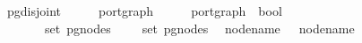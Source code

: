 \isamarkupfalse%
\ pg{\isacharunderscore}disjoint\ {\isacharcolon}{\isacharcolon}\ {\isachardoublequoteopen}{\isacharparenleft}\ \ \ \ port{\isacharunderscore}graph\ {\isasymRightarrow}\ {\isacharparenleft}\ \ \ \ port{\isacharunderscore}graph\ {\isasymRightarrow}\ bool{\isachardoublequoteclose}\isanewline
\ \ \ {\isachardoublequoteopen}\ \ {\isacharequal}\isanewline
\ \ \ \ {\isacharparenleft}{\isasymforall}\ \ {\isasymin}\ set\ {\isacharparenleft}pg{\isacharunderscore}nodes\ \ {\isasymand}\ \ {\isasymin}\ set\ {\isacharparenleft}pg{\isacharunderscore}nodes\ \isanewline
{}\ node{\isacharunderscore}name\ \ {\isasymnoteq}\ node{\isacharunderscore}name\ 
